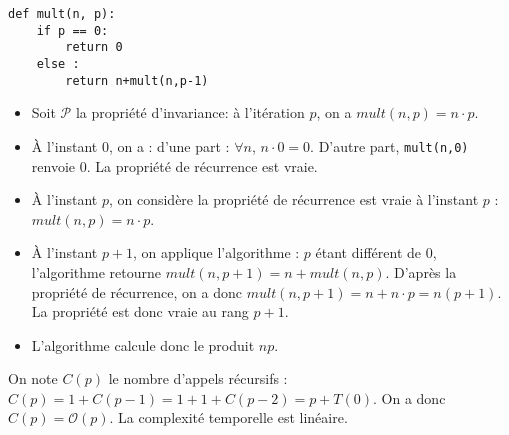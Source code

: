 \ifprof
\vspace{1cm}
\else
\begin{multicols}{2}
\fi



\setcounter{numques}{0}



\ifprof
\else
\begin{py}
\begin{lstlisting}
def mult(n, p):
    if p == 0:
        return 0
    else :
        return n+mult(n,p-1)
\end{lstlisting}
\end{py}
\fi


\ifprof
\begin{corrige}
\begin{itemize}
\item Soit $\mathcal{P}$ la propriété d'invariance: à l'itération $p$, on a $mult(n,p)=n\cdot p$. 
\item À l'instant 0, on a : d'une part : $\forall n$, $n\cdot 0 = 0$. D'autre part, \texttt{mult(n,0)} renvoie 0. La propriété de récurrence est vraie. 
\item À l'instant $p$, on considère la propriété de récurrence est vraie à l'instant $p$ : $mult(n,p)=n\cdot p$.
\item À l'instant $p+1$, on applique l'algorithme : $p$ étant différent de 0, l'algorithme retourne $mult(n,p+1)=n+mult(n,p)$. D'après la propriété de récurrence, on a donc $mult(n,p+1)=n+ n\cdot p =n(p+1) $. La propriété est donc vraie au rang $p+1$.
\item L'algorithme calcule donc le produit $np$.
\end{itemize}
\end{corrige}
\else
\fi

\ifprof
\begin{corrige}
On note $C(p)$ le nombre d'appels récursifs : $C(p) = 1+C(p-1) = 1+1+C(p-2)=p+T(0)$. On a donc $C(p)=\mathcal{O}(p)$. La complexité temporelle est linéaire.
\end{corrige}
\else
\fi


\end{multicols}
